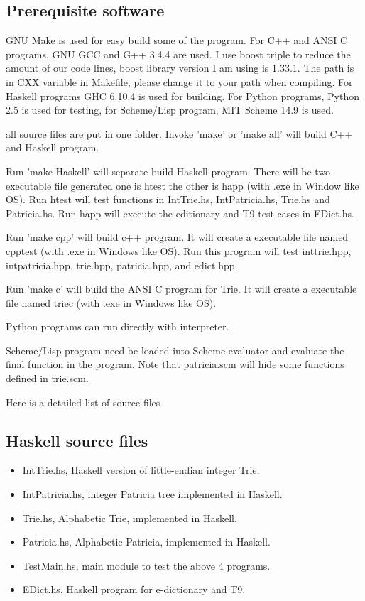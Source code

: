 \documentclass{article}
\begin{document}
\subsection{Prerequisite software}
GNU Make is used for easy build some of the program. For C++ and ANSI C programs,
GNU GCC and G++ 3.4.4 are used. I use boost triple to reduce the
amount of our code lines, boost library version I am using is
1.33.1. The path is in CXX variable in Makefile, please change it to
your path when compiling.
For Haskell programs GHC 6.10.4 is used
for building. For Python programs, Python 2.5 is used for testing, for
Scheme/Lisp program, MIT Scheme 14.9 is used.

all source files are put in one folder. Invoke 'make' or 'make all'
will build C++ and Haskell program.

Run 'make Haskell' will separate build Haskell program. There will be
two executable file generated one is htest the other is happ (with .exe
in Window like OS). Run htest will test functions in IntTrie.hs, IntPatricia.hs,
Trie.hs and Patricia.hs. Run happ will execute the editionary and T9
test cases in EDict.hs.

Run 'make cpp' will build c++ program. It will create a executable
file named cpptest (with .exe in Windows like OS). Run this program
will test inttrie.hpp, intpatricia.hpp, trie.hpp, patricia.hpp, and
edict.hpp.

Run 'make c' will build the ANSI C program for Trie. It will create a
executable file named triec (with .exe in Windows like OS).

Python programs can run directly with interpreter.

Scheme/Lisp program need be loaded into Scheme evaluator and evaluate
the final function in the program. Note that patricia.scm will hide
some functions defined in trie.scm.

Here is a detailed list of source files

\subsection{Haskell source files}

\begin{itemize}
\item IntTrie.hs, Haskell version of little-endian integer Trie.
\item IntPatricia.hs, integer Patricia tree implemented in Haskell.
\item Trie.hs, Alphabetic Trie, implemented in Haskell.
\item Patricia.hs, Alphabetic Patricia, implemented in Haskell.
\item TestMain.hs, main module to test the above 4 programs.
\item EDict.hs, Haskell program for e-dictionary and T9.
\end{itemize}
\end{document}
